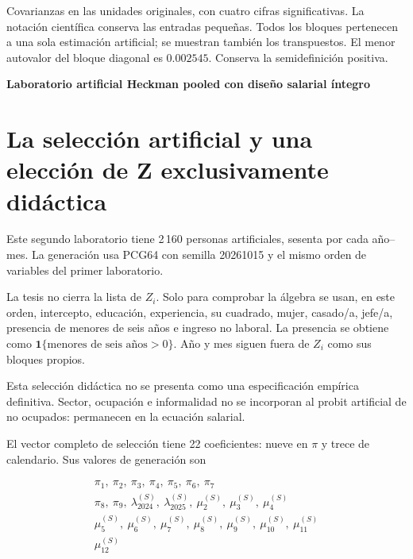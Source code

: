 \documentclass[11pt,a4paper]{article}
\begin{document}
Covarianzas en las unidades originales, con cuatro cifras significativas. La notación científica conserva las entradas pequeñas. Todos los bloques pertenecen a una sola estimación artificial; se muestran también los transpuestos.
El menor autovalor del bloque diagonal es $0.002545$. Conserva la semidefinición positiva.
\clearpage
{}
{\large\bfseries\color{azul}Laboratorio artificial Heckman pooled con diseño salarial íntegro}\par\vspace{2mm}
\section{La selección artificial y una elección de Z exclusivamente didáctica}

Este segundo laboratorio tiene 2\,160 personas artificiales, sesenta por cada año--mes. La generación usa PCG64 con semilla 20261015 y el mismo orden de variables del primer laboratorio.

La tesis no cierra la lista de $Z_i$. Solo para comprobar la álgebra se usan, en este orden, intercepto, educación, experiencia, su cuadrado, mujer, casado/a, jefe/a, presencia de menores de seis años e ingreso no laboral. La presencia se obtiene como $\mathbf1\{\text{menores de seis años}>0\}$. Año y mes siguen fuera de $Z_i$ como sus bloques propios.

Esta selección didáctica no se presenta como una especificación empírica definitiva. Sector, ocupación e informalidad no se incorporan al probit artificial de no ocupados: permanecen en la ecuación salarial.

El vector completo de selección tiene 22 coeficientes: nueve en $\pi$ y trece de calendario. Sus valores de generación son

\[
\begin{gathered}\pi_1,\ \pi_2,\ \pi_3,\ \pi_4,\ \pi_5,\ \pi_6,\ \pi_7\\\pi_8,\ \pi_9,\ \lambda_{2024}^{(S)},\ \lambda_{2025}^{(S)},\ \mu_2^{(S)},\ \mu_3^{(S)},\ \mu_4^{(S)}\\\mu_5^{(S)},\ \mu_6^{(S)},\ \mu_7^{(S)},\ \mu_8^{(S)},\ \mu_9^{(S)},\ \mu_10^{(S)},\ \mu_11^{(S)}\\\mu_12^{(S)}\end{gathered}
\]
\end{document}
